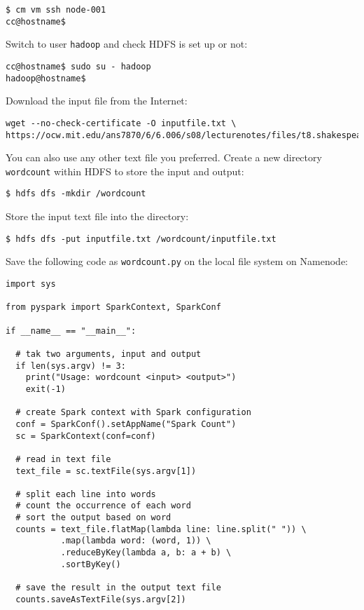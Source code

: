 \begin{verbatim}
$ cm vm ssh node-001
cc@hostname$
\end{verbatim}

Switch to user \texttt{hadoop} and check HDFS is set up or not:

\begin{verbatim}
cc@hostname$ sudo su - hadoop
hadoop@hostname$
\end{verbatim}

Download the input file from the Internet:

\begin{verbatim}
wget --no-check-certificate -O inputfile.txt \
https://ocw.mit.edu/ans7870/6/6.006/s08/lecturenotes/files/t8.shakespeare.txt
\end{verbatim}

You can also use any other text file you preferred. Create a new
directory \texttt{wordcount} within HDFS to store the input and output:

\begin{verbatim}
$ hdfs dfs -mkdir /wordcount
\end{verbatim}

Store the input text file into the directory:

\begin{verbatim}
$ hdfs dfs -put inputfile.txt /wordcount/inputfile.txt
\end{verbatim}

Save the following code as \texttt{wordcount.py} on the local file
system on Namenode:

\begin{verbatim}
import sys

from pyspark import SparkContext, SparkConf

if __name__ == "__main__":

  # tak two arguments, input and output
  if len(sys.argv) != 3:
    print("Usage: wordcount <input> <output>")
    exit(-1)

  # create Spark context with Spark configuration
  conf = SparkConf().setAppName("Spark Count")
  sc = SparkContext(conf=conf)

  # read in text file
  text_file = sc.textFile(sys.argv[1])

  # split each line into words
  # count the occurrence of each word
  # sort the output based on word
  counts = text_file.flatMap(lambda line: line.split(" ")) \
           .map(lambda word: (word, 1)) \
           .reduceByKey(lambda a, b: a + b) \
           .sortByKey()

  # save the result in the output text file
  counts.saveAsTextFile(sys.argv[2])
\end{verbatim}

